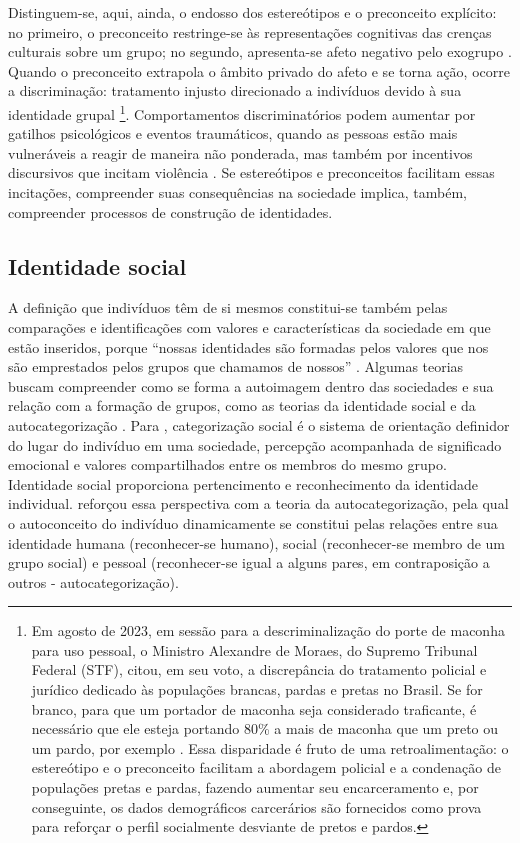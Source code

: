 \documentclass[portuguese]{textolivre}
\begin{document}
Distinguem-se, aqui, ainda, o endosso dos estereótipos e o preconceito explícito: no primeiro, o preconceito restringe-se às representações cognitivas das crenças culturais sobre um grupo; no segundo, apresenta-se afeto negativo pelo exogrupo \cite{liberman2017origins}. Quando o preconceito extrapola o âmbito privado do afeto e se torna ação, ocorre a discriminação: tratamento injusto direcionado a indivíduos devido à sua identidade grupal \cite{dovidio2010}\footnote{Em agosto de 2023, em sessão para a descriminalização do porte de maconha para uso pessoal, o Ministro Alexandre de Moraes, do Supremo Tribunal Federal (STF), citou, em seu voto, a discrepância do tratamento policial e jurídico dedicado às populações brancas, pardas e pretas no Brasil. Se for branco, para que um portador de maconha seja considerado traficante, é necessário que ele esteja portando 80\% a mais de maconha que um preto ou um pardo, por exemplo \cite{pauxis2023}. Essa disparidade é fruto de uma retroalimentação: o estereótipo e o preconceito facilitam a abordagem policial e a condenação de populações pretas e pardas, fazendo aumentar seu encarceramento e, por conseguinte, os dados demográficos carcerários são fornecidos como prova para reforçar o perfil socialmente desviante de pretos e pardos.}. Comportamentos discriminatórios podem aumentar por gatilhos psicológicos e eventos traumáticos, quando as pessoas estão mais vulneráveis a reagir de maneira não ponderada, mas também por incentivos discursivos que incitam violência \cite{takano2023dynamics}. Se estereótipos e preconceitos facilitam essas incitações, compreender suas consequências na sociedade implica, também, compreender processos de construção de identidades.

\subsection{Identidade social}

A definição que indivíduos têm de si mesmos constitui-se também pelas comparações e identificações com valores e características da sociedade em que estão inseridos, porque “nossas identidades são formadas pelos valores que nos são emprestados pelos grupos que chamamos de nossos” \cite[p.ix]{lieberman2013social}. Algumas teorias buscam compreender como se forma a autoimagem dentro das sociedades e sua relação com a formação de grupos, como as teorias da identidade social \cite{tajfel1971social} e da autocategorização \cite{turner1987}. Para \textcite{tajfel1971social}, categorização social é o sistema de orientação definidor do lugar do indivíduo em uma sociedade, percepção acompanhada de significado emocional e valores compartilhados entre os membros do mesmo grupo. Identidade social proporciona pertencimento e reconhecimento da identidade individual. \textcite{turner1987} reforçou essa perspectiva com a teoria da autocategorização, pela qual o autoconceito do indivíduo dinamicamente se constitui pelas relações entre sua identidade humana (reconhecer-se humano), social (reconhecer-se membro de um grupo social) e pessoal (reconhecer-se igual a alguns pares, em contraposição a outros - autocategorização).
\end{document}
